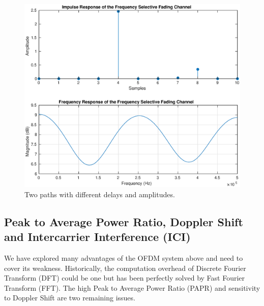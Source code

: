 \begin{figure}[!htbp]
    \centering
    \includegraphics[width=\linewidth]{ffading.eps}
    \caption{Two paths with different delays and amplitudes.}
    \label{fig:ffading}
\end{figure}

\subsection{Peak to Average Power Ratio, Doppler Shift and Intercarrier Interference (ICI)}
We have explored many advantages of the OFDM system above and need to cover its weakness. Historically, the computation overhead of Discrete Fourier Transform (DFT) could be one but has been perfectly solved by Fast Fourier Transform (FFT). The high Peak to Average Power Ratio (PAPR) and sensitivity to Doppler Shift are two remaining issues.

